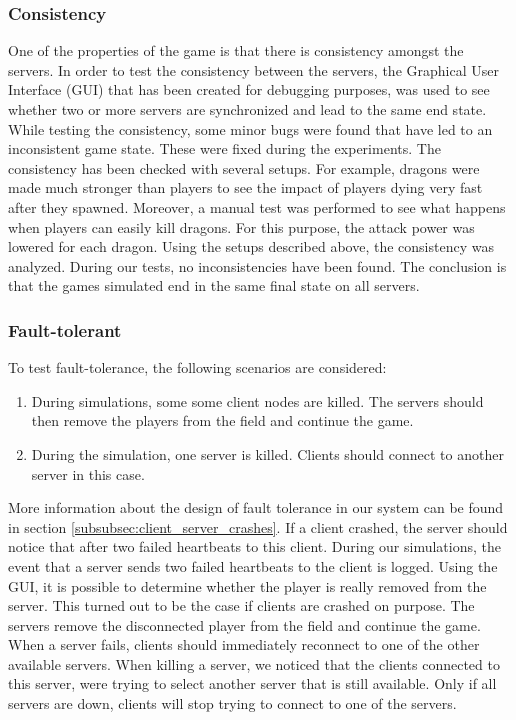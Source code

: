 	\subsubsection{Consistency}
	\label{subsubsec:consistency}
		One of the properties of the game is that there is consistency amongst the servers.
		In order to test the consistency between the servers, the Graphical User Interface (GUI) that has been created for debugging purposes, was used to see whether two or more servers are synchronized and lead to the same end state.
		While testing the consistency, some minor bugs were found that have led to an inconsistent game state. These were fixed during the experiments.
		The consistency has been checked with several setups. For example, dragons were made much stronger than players to see the impact of players dying very fast after they spawned.
		Moreover, a manual test was performed to see what happens when players can easily kill dragons. For this purpose, the attack power was lowered for each dragon.
		Using the setups described above, the consistency was analyzed. During our tests, no inconsistencies have been found. The conclusion is that the games simulated end in the same final state on all servers.
		
	\subsubsection{Fault-tolerant}
	\label{subsubsec:fault-tolerant}
		To test fault-tolerance, the following scenarios are considered:
		\begin{enumerate}
			\item During simulations, some some client nodes are killed. The servers should then remove the players from the field and continue the game.
			\item During the simulation, one server is killed. Clients should connect to another server in this case.
		\end{enumerate}
		
		More information about the design of fault tolerance in our system can be found in section \ref{subsubsec:client_server_crashes}. If a client crashed, the server should notice that after two failed heartbeats to this client. During our simulations, the event that a server sends two failed heartbeats to the client is logged. Using the GUI, it is possible to determine whether the player is really removed from the server. This turned out to be the case if clients are crashed on purpose. The servers remove the disconnected player from the field and continue the game.\\
		When a server fails, clients should immediately reconnect to one of the other available servers. When killing a server, we noticed that the clients connected to this server, were trying to select another server that is still available. Only if all servers are down, clients will stop trying to connect to one of the servers.
		
